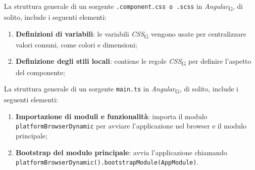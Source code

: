 La struttura generale di un sorgente \texttt{.component.css o .scss} in \textit{Angular}\textsubscript{G}, di solito, include i seguenti elementi:
\begin{enumerate}
    \item \textbf{Definizioni di variabili}: le variabili \textit{CSS}\textsubscript{G} vengono usate per centralizzare valori comuni, come colori e dimensioni;
    \item \textbf{Definizione degli stili locali}: contiene le regole \textit{CSS}\textsubscript{G} per definire l'aspetto del componente;
\end{enumerate}

La struttura generale di un sorgente \texttt{main.ts} in \textit{Angular}\textsubscript{G}, di solito, include i seguenti elementi:
\begin{enumerate}
    \item \textbf{Importazione di moduli e funzionalità}: importa il modulo \\ \texttt{platformBrowserDynamic} per avviare l'applicazione nel browser e il modulo principale;
    \item \textbf{Bootstrap del modulo principale}: avvia l'applicazione chiamando \\ \texttt{platformBrowserDynamic().bootstrapModule(AppModule)}.
\end{enumerate}

